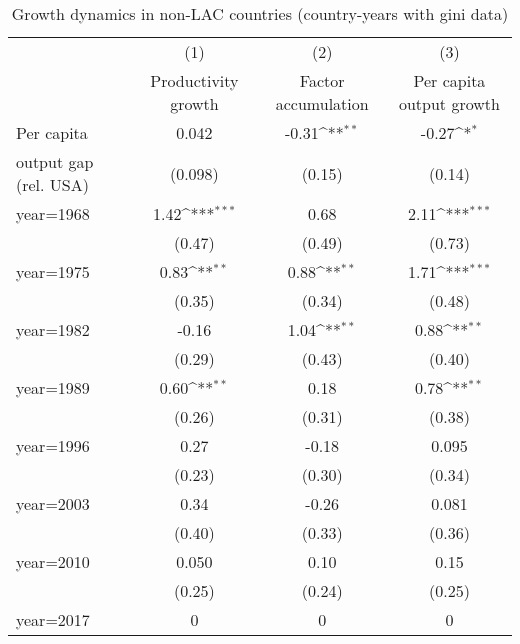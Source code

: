 \begin{table}[htbp]\centering
\def\sym#1{\ifmmode^{#1}\else\(^{#1}\)\fi}
\caption{Growth dynamics in non-LAC countries (country-years with gini data)}
\begin{tabular}{l*{3}{c}}
\toprule
                &\multicolumn{1}{c}{(1)}&\multicolumn{1}{c}{(2)}&\multicolumn{1}{c}{(3)}\\
                &\multicolumn{1}{c}{Productivity growth}&\multicolumn{1}{c}{Factor accumulation}&\multicolumn{1}{c}{Per capita output growth}\\
\midrule
Per capita      &    0.042         &    -0.31\sym{**} &    -0.27\sym{*}  \\
output gap (rel. USA)&  (0.098)         &   (0.15)         &   (0.14)         \\
\addlinespace
year=1968       &     1.42\sym{***}&     0.68         &     2.11\sym{***}\\
                &   (0.47)         &   (0.49)         &   (0.73)         \\
\addlinespace
year=1975       &     0.83\sym{**} &     0.88\sym{**} &     1.71\sym{***}\\
                &   (0.35)         &   (0.34)         &   (0.48)         \\
\addlinespace
year=1982       &    -0.16         &     1.04\sym{**} &     0.88\sym{**} \\
                &   (0.29)         &   (0.43)         &   (0.40)         \\
\addlinespace
year=1989       &     0.60\sym{**} &     0.18         &     0.78\sym{**} \\
                &   (0.26)         &   (0.31)         &   (0.38)         \\
\addlinespace
year=1996       &     0.27         &    -0.18         &    0.095         \\
                &   (0.23)         &   (0.30)         &   (0.34)         \\
\addlinespace
year=2003       &     0.34         &    -0.26         &    0.081         \\
                &   (0.40)         &   (0.33)         &   (0.36)         \\
\addlinespace
year=2010       &    0.050         &     0.10         &     0.15         \\
                &   (0.25)         &   (0.24)         &   (0.25)         \\
\addlinespace
year=2017       &        0         &        0         &        0         \\

\end{tabular}
\end{table}
